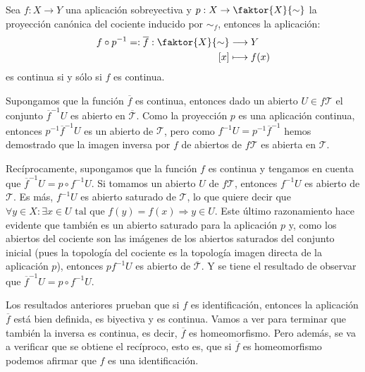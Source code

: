 \begin{prop}
Sea $f: X \rightarrow Y$ una aplicación sobreyectiva y $p: X \rightarrow \faktor{X}{\sim}$ la proyección canónica del cociente inducido por $\sim_f$, entonces la aplicación:
\begin{align*}
f\circ p^{-1} =: \overline{f} : \faktor{X}{\sim} & \longrightarrow Y \\
 			  [x] & \longmapsto f(x)
\end{align*}
es continua si y sólo si $f$ es continua.
\end{prop}
\begin{demo}
Supongamos que la función $\overline{f}$ es continua, entonces dado un abierto $U\in f\mathcal{T}$ el conjunto $\overline{f}^{-1} U$ es abierto en $\overline{\mathcal{T}}$. Como la proyección $p$ es una aplicación continua, entonces $p^{-1}\overline{f}^{-1} U$ es un abierto de $\mathcal{T}$, pero como $f^{-1} U = p^{-1}\overline{f}^{-1}$ hemos demostrado que la imagen inversa por $f$ de abiertos de $f\mathcal{T}$ es abierta en $\mathcal{T}$.

Recíprocamente, supongamos que la función $f$ es continua y tengamos en cuenta que $\overline{f}^{-1} U = p \circ f^{-1} U$. Si tomamos un abierto $U$ de $f\mathcal{T}$, entonces $f^{-1}U$ es abierto de $\mathcal{T}$. Es más, $f^{-1} U$ es abierto saturado de $\mathcal{T}$, lo que quiere decir que $\forall y \in X : \exists x \in U \mbox{ tal que } f(y) = f(x) \Rightarrow y \in U$. Este último razonamiento hace evidente que también es un abierto saturado para la aplicación $p$ y, como los abiertos del cociente son las imágenes de los abiertos saturados del conjunto inicial (pues la topología del cociente es la topología imagen directa de la aplicación $p$), entonces $p f^{-1} U$ es abierto de $\overline{\mathcal{T}}$. Y se tiene el resultado de observar que $\overline{f}^{-1} U = p \circ f^{-1} U$.
\end{demo}

Los resultados anteriores prueban que si $f$ es identificación, entonces la aplicación $\overline{f}$ está bien definida, es biyectiva y es continua. Vamos a ver para terminar que también la inversa es continua, es decir, $\overline{f}$ es homeomorfismo. Pero además, se va a verificar que se obtiene el recíproco, esto es, que si $\overline{f}$ es homeomorfismo podemos afirmar que $f$ es una identificación.

